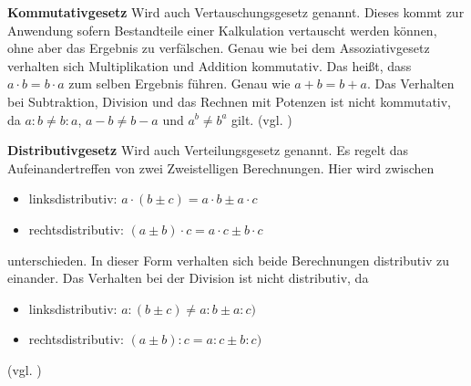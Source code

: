 \documentclass[12pt,a4paper]{article}
\theoremstyle{definition}
\begin{document}
\textbf{Kommutativgesetz}\newline
Wird auch Vertauschungsgesetz genannt.
Dieses kommt zur Anwendung sofern Bestandteile einer Kalkulation vertauscht werden können, ohne aber das Ergebnis zu verfälschen.\newline
Genau wie bei dem Assoziativgesetz verhalten sich Multiplikation und Addition kommutativ.
Das heißt, dass $a \cdot b = b \cdot a$ zum selben Ergebnis führen.
Genau wie $a + b = b + a$.\newline
Das Verhalten bei Subtraktion, Division und das Rechnen mit Potenzen ist nicht kommutativ, da $a : b \neq b : a$, $a - b \neq b - a$ und $a^b \neq b^a$ gilt.
(vgl. \cite{EncyclopediaofMathematics2014})

\textbf{Distributivgesetz}\newline
Wird auch Verteilungsgesetz genannt.
Es regelt das Aufeinandertreffen von zwei Zweistelligen Berechnungen.
Hier wird zwischen
\begin{itemize}
    \item linksdistributiv: $a \cdot (b \pm c) = a \cdot b \pm a \cdot c$
    \item rechtsdistributiv: $(a \pm b) \cdot c = a \cdot c \pm b\cdot c$
\end{itemize}
unterschieden.
In dieser Form verhalten sich beide Berechnungen distributiv zu einander.\newline
Das Verhalten bei der Division ist nicht distributiv, da
\begin{itemize}
    \item linksdistributiv: $a : (b \pm c) \neq a :b \pm a : c)$
    \item rechtsdistributiv: $(a \pm b) : c = a :c \pm b : c)$
\end{itemize}
(vgl. \cite{EncyclopediaofMathematics2016})
\end{document}
